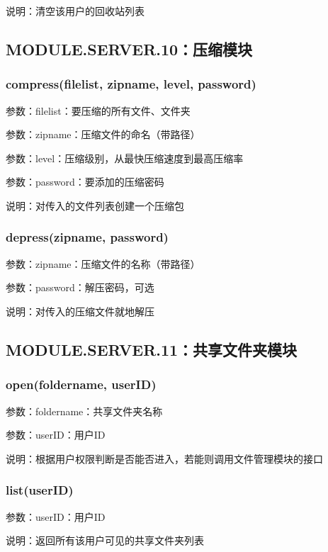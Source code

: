说明：清空该用户的回收站列表

\subsection{MODULE.SERVER.10：压缩模块}
\subsubsection{compress(filelist, zipname, level, password)}

参数：filelist：要压缩的所有文件、文件夹

参数：zipname：压缩文件的命名（带路径）

参数：level：压缩级别，从最快压缩速度到最高压缩率

参数：password：要添加的压缩密码

说明：对传入的文件列表创建一个压缩包

\subsubsection{depress(zipname, password)}
参数：zipname：压缩文件的名称（带路径）

参数：password：解压密码，可选

说明：对传入的压缩文件就地解压

\subsection{MODULE.SERVER.11：共享文件夹模块}
\subsubsection{open(foldername, userID)}
参数：foldername：共享文件夹名称

参数：userID：用户ID

说明：根据用户权限判断是否能否进入，若能则调用文件管理模块的接口

\subsubsection{list(userID)}
参数：userID：用户ID

说明：返回所有该用户可见的共享文件夹列表



 

